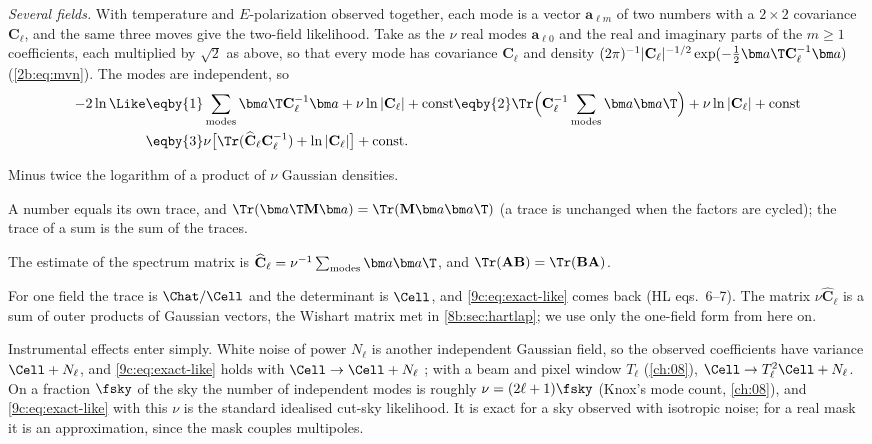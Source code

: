 \emph{Several fields.} With temperature and $E$-polarization observed together, each mode is a vector
$\bm a_{\ell m}$ of two numbers with a $2\times2$ covariance $\mathbf C_\ell$, and the same three moves give the
two-field likelihood. Take as the $\nu$ real modes $\bm a_{\ell0}$ and the real and imaginary parts of the $m\ge1$ coefficients,
each multiplied by $\sqrt2$ as above, so that every mode has covariance $\mathbf C_\ell$ and density
$(2\pi)^{-1}|\mathbf C_\ell|^{-1/2}\exp(-\tfrac12\bm a\T\mathbf C_\ell^{-1}\bm a)$ (\cref{2b:eq:mvn}). The modes are
independent, so
\begin{align}
  -2\ln\Like
  &\eqby{1}\sum_{\rm modes}\bm a\T\mathbf C_\ell^{-1}\bm a+\nu\ln|\mathbf C_\ell|+\text{const}
   \eqby{2}\Tr\Bigl(\mathbf C_\ell^{-1}\sum_{\rm modes}\bm a\bm a\T\Bigr)+\nu\ln|\mathbf C_\ell|+\text{const}
   \nonumber\\
  &\eqby{3}\nu\bigl[\Tr(\widehat{\mathbf C}_\ell\mathbf C_\ell^{-1})+\ln|\mathbf C_\ell|\bigr]+\text{const}.
  \label{9c:eq:exact-matrix}
\end{align}
\begin{explain}
  \item Minus twice the logarithm of a product of $\nu$ Gaussian densities.
  \item A number equals its own trace, and $\Tr(\bm a\T\mathbf M\bm a)=\Tr(\mathbf M\bm a\bm a\T)$ (a trace is unchanged
        when the factors are cycled); the trace of a sum is the sum of the traces.
  \item The estimate of the spectrum matrix is $\widehat{\mathbf C}_\ell=\nu^{-1}\sum_{\rm modes}\bm a\bm a\T$, and
        $\Tr(\mathbf A\mathbf B)=\Tr(\mathbf B\mathbf A)$.
\end{explain}
For one field the trace is $\Chat/\Cell$ and the determinant is $\Cell$, and \eqref{9c:eq:exact-like} comes back
(HL eqs.~6--7). The matrix $\nu\widehat{\mathbf C}_\ell$ is a sum of outer products of Gaussian vectors, the
Wishart matrix met in \cref{8b:sec:hartlap}; we use only the one-field form from here on.

Instrumental effects enter simply. White noise of power $N_\ell$ is another independent Gaussian field,
so the observed coefficients have variance $\Cell+N_\ell$, and \eqref{9c:eq:exact-like} holds with
$\Cell\to\Cell+N_\ell$ ; with a beam and pixel window $T_\ell$ (\cref{ch:08}),
$\Cell\to T_\ell^2\Cell+N_\ell$. On a fraction $\fsky$ of the sky the number of independent modes is
roughly $\nu=(2\ell+1)\fsky$ (Knox's mode count, \cref{ch:08}), and \eqref{9c:eq:exact-like} with this
$\nu$ is the standard idealised cut-sky likelihood. It is exact for a sky observed with isotropic noise;
for a real mask it is an approximation, since the mask couples multipoles.

